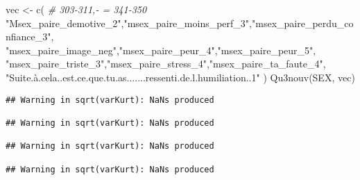 \documentclass[
]{article}
\newenvironment{Shaded}{\begin{snugshade}}{\end{snugshade}}
\newcommand{\CommentTok}[1]{\textcolor[rgb]{0.56,0.35,0.01}{\textit{#1}}}
\newcommand{\FunctionTok}[1]{\textcolor[rgb]{0.00,0.00,0.00}{#1}}
\newcommand{\NormalTok}[1]{#1}
\newcommand{\OtherTok}[1]{\textcolor[rgb]{0.56,0.35,0.01}{#1}}
\newcommand{\StringTok}[1]{\textcolor[rgb]{0.31,0.60,0.02}{#1}}
\begin{document}
\begin{Shaded}
\begin{Highlighting}[]
\NormalTok{vec }\OtherTok{\textless{}{-}} \FunctionTok{c}\NormalTok{(  }\CommentTok{\# 303{-}311,{-} = 341{-}350 }
  \StringTok{"Msex\_paire\_demotive\_2"}\NormalTok{,}\StringTok{"msex\_paire\_moins\_perf\_3"}\NormalTok{,}\StringTok{"msex\_paire\_perdu\_confiance\_3"}\NormalTok{,}
  \StringTok{"msex\_paire\_image\_neg"}\NormalTok{,}\StringTok{"msex\_paire\_peur\_4"}\NormalTok{,}\StringTok{"msex\_paire\_peur\_5"}\NormalTok{,}
  \StringTok{"msex\_paire\_triste\_3"}\NormalTok{,}\StringTok{"msex\_paire\_stress\_4"}\NormalTok{,}\StringTok{"msex\_paire\_ta\_faute\_4"}\NormalTok{,}
  \StringTok{"Suite.à.cela..est.ce.que.tu.as.......ressenti.de.l.humiliation..1"}
\NormalTok{  )}
\FunctionTok{Qu3nouv}\NormalTok{(SEX, vec)}
\end{Highlighting}
\end{Shaded}

\begin{verbatim}
## Warning in sqrt(varKurt): NaNs produced

## Warning in sqrt(varKurt): NaNs produced

## Warning in sqrt(varKurt): NaNs produced

## Warning in sqrt(varKurt): NaNs produced
\end{verbatim}
\end{document}
